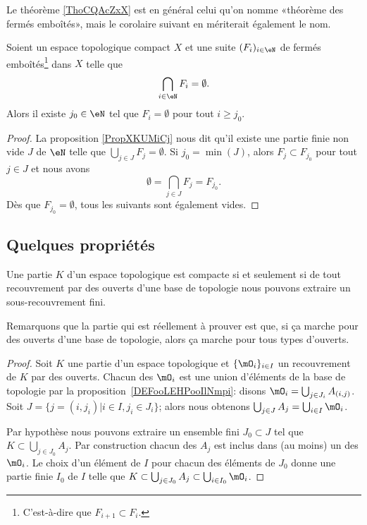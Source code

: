 Le théorème \ref{ThoCQAcZxX} est en général celui qu'on nomme «théorème des fermés emboîtés», mais le corolaire suivant en mériterait également le nom.
\begin{corollary}       \label{CORooQABLooMPSUBf}
	Soient un espace topologique compact \( X\) et une suite \( (F_i)_{i\in \eN}\) de fermés emboîtés\footnote{C'est-à-dire que \( F_{i+1}\subset F_i\).} dans \( X\) telle que
	\begin{equation}
		\bigcap_{i\in \eN}F_i=\emptyset.
	\end{equation}
	Alors il existe \( j_0\in \eN\) tel que \( F_i=\emptyset\) pour tout \( i\geq j_0\).
\end{corollary}

\begin{proof}
	La proposition \ref{PropXKUMiCj} nous dit qu'il existe une partie finie non vide \( J\) de \( \eN\) telle que \( \bigcup_{j\in J}F_j=\emptyset\). Si \( j_0=\min(J)\), alors \( F_j\subset F_{j_0}\) pour tout \( j\in J\) et nous avons
	\begin{equation}
		\emptyset=\bigcap_{j\in J}F_j=F_{j_0}.
	\end{equation}
	Dès que \( F_{j_0}=\emptyset\), tous les suivants sont également vides.
\end{proof}




\subsection{Quelques propriétés}

\begin{lemma}   \label{LemOWVooZKndbI}
	Une partie \( K\) d'un espace topologique est compacte si et seulement si de tout recouvrement par des ouverts d'une base de topologie nous pouvons extraire un sous-recouvrement fini.
\end{lemma}
Remarquons que la partie qui est réellement à prouver est que, si \og ça marche \fg{} pour des ouverts d'une base de topologie, alors \og ça marche\fg{} pour tous types d'ouverts.
\begin{proof}
	Soit \( K\) une partie d'un espace topologique et \( \{ \mO_i \}_{i\in I}\) un recouvrement de \( K\) par des ouverts. Chacun des \( \mO_i\) est une union d'éléments de la base de topologie par la proposition~\ref{DEFooLEHPooIlNmpi}: disons \( \mO_i = \bigcup_{j \in J_i} A_{(i,j)} \). Soit \( J = \{ j = (i, j_i) | i \in I, j_i \in J_i \} \); alors nous obtenons  \( \bigcup_{j\in J}A_j=\bigcup_{i\in I}\mO_i\).

	Par hypothèse nous pouvons extraire un ensemble fini \( J_0\subset J\) tel que \( K\subset\bigcup_{j\in J_0}A_j\). Par construction chacun des \( A_j\) est inclus dans (au moins) un des \( \mO_i\). Le choix d'un élément de \( I\) pour chacun des éléments de \( J_0\) donne une partie finie \( I_0\) de \( I\) telle que \( K\subset\bigcup_{j\in J_0}A_j\subset\bigcup_{i\in I_0}\mO_i\).
\end{proof}


